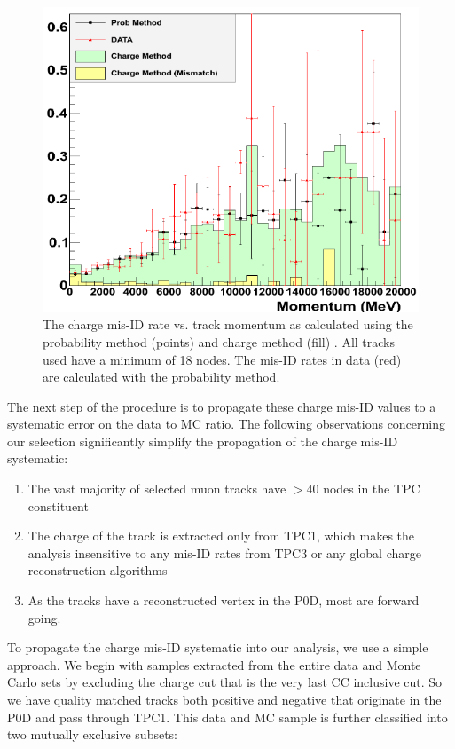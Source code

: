 \begin{figure}[h]
\centering
\includegraphics[width=5in]{Figures/Systematics/chmisID1.png}
\caption{The charge mis-ID rate vs. track momentum as calculated using the probability method (points) and charge method (fill)  \cite{chmisidtn}. All tracks used have a minimum of 18 nodes. The mis-ID rates in data (red) are calculated with the probability method.}
\label{fig:chmisid}
\end{figure}

The next step of the procedure is to propagate these charge mis-ID values to a systematic error on the data to MC ratio. The following observations concerning our selection significantly simplify the propagation of the charge mis-ID systematic:
\begin{enumerate}
\item The vast majority of selected muon tracks have $> 40$ nodes in the TPC constituent
\item The charge of the track is extracted only from TPC1, which makes the analysis insensitive to any mis-ID rates from TPC3 or any global charge reconstruction algorithms
\item As the tracks have a reconstructed vertex in the P0D, most are forward going.
\end{enumerate}

To propagate the charge mis-ID systematic into our analysis, we use a simple approach. We begin with samples extracted from the entire data and Monte Carlo sets by excluding the charge cut that is the very last CC inclusive cut. So we have quality matched tracks both positive and negative that originate in the P0D and pass through TPC1. This data and MC sample is further classified into two mutually exclusive subsets:

